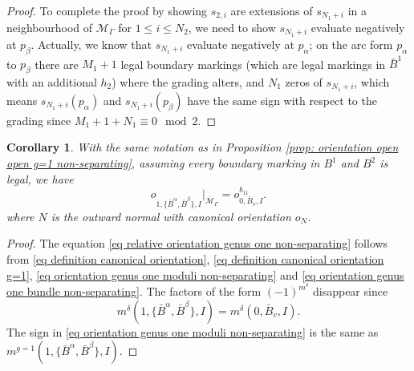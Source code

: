 \documentclass[11pt,a4paper]{article}
\newtheorem{cor}[dummy]{Corollary}
\theoremstyle{definition}
\theoremstyle{remark}
\numberwithin{equation}{section}
\def\Mbar{{\overline{\mathcal M}}}
\begin{document}
\begin{proof}
    To complete the proof by showing $s_{2,i}$ are extensions of $s_{N_1+i}$ in a neighbourhood of $\mathcal M_\Gamma$ for $1\le i \le N_2$, we need to show $s_{N_1+i}$ evaluate negatively at $p_\beta$. Actually, we know that $s_{N_1+i}$ evaluate negatively at $p_\alpha$; on the arc form $p_\alpha$ to $p_\beta$ there are $M_1+1$ legal boundary markings (which are legal markings in $\bar B^1$ with an additional $h_2$) where the grading alters, and $N_1$ zeros of $s_{N_1+i}$, which means $s_{N_1+i}(p_\alpha)$ and $s_{N_1+i}(p_\beta)$ have the same sign with respect to the grading since $M_1+1+N_1\equiv 0 \mod 2$. 
\end{proof}


\begin{cor}\label{cor:orientation relative nonseperating}
    With the same notation as in Proposition \ref{prop: orientation open open g=1 non-separating}, assuming every boundary marking in $B^1$ and $B^2$ is legal, we have 
    \begin{equation}\label{eq relative orientation genus one non-separating}
         {{o}}^{}_{1,\{\bar{B}^\alpha,\bar{B}^\beta\},I}\big |_{\Mbar_\Gamma^{}}=
         {{o}}^{b_{11}}_{0,\bar B_v,I}.
         \end{equation}
         where $N$ is the outward normal with canonical orientation $o_N$.
\end{cor}
\begin{proof}
    The equation \eqref{eq relative orientation genus one non-separating}  follows from \eqref{eq definition canonical orientation}, \eqref{eq definition canonical orientation g=1}, \eqref{eq orientation genus one moduli non-separating} and \eqref{eq orientation genus one bundle non-separating}.  The factors of the form $(-1)^{m^\delta}$ disappear since
    $$
        m^\delta(1,\{\bar{B}^\alpha,\bar{B}^\beta\},I)=m^\delta(0,\bar{B}_v,I).
    $$
    The sign in \eqref{eq orientation genus one moduli non-separating} is the same as
    $m^{g=1}(1,\{\bar{B}^\alpha,\bar{B}^\beta\},I)$.
\end{proof}


  
\end{document}
